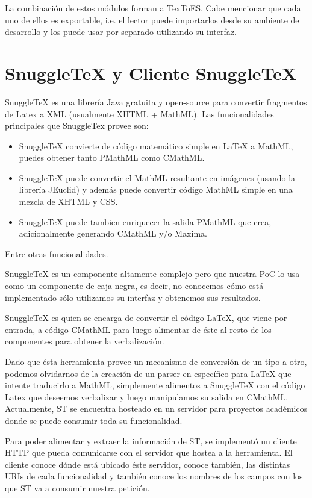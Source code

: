La combinación de estos módulos forman a TexToES. Cabe mencionar que cada uno de ellos es exportable, i.e. el lector puede importarlos desde su ambiente de desarrollo y los puede usar por separado utilizando su interfaz.

\section{SnuggleTeX y Cliente SnuggleTeX}

SnuggleTeX es una librería Java gratuita y open-source para convertir fragmentos de Latex a XML (usualmente XHTML + MathML). Las funcionalidades principales que SnuggleTex provee son:

\begin{itemize}
\item SnuggleTeX convierte de código matemático simple en LaTeX a MathML, puedes obtener tanto PMathML como CMathML.
\item SnuggleTeX puede convertir el MathML resultante en imágenes (usando la librería JEuclid) y además puede convertir código MathML simple en una mezcla de XHTML y CSS.
\item SnuggleTeX puede tambien enriquecer la salida PMathML que crea, adicionalmente generando CMathML y/o Maxima.
\end{itemize}

Entre otras funcionalidades.

SnuggleTeX es un componente altamente complejo pero que nuestra PoC lo usa como un componente de caja negra, es decir, no conocemos cómo está implementado sólo utilizamos su interfaz y obtenemos sus resultados.

SnuggleTeX es quien se encarga de convertir el código LaTeX, que viene por entrada, a código CMathML para luego alimentar de éste al resto de los componentes para obtener la verbalización.

Dado que ésta herramienta provee un mecanismo de conversión de un tipo a otro, podemos olvidarnos de la creación de un parser en específico para LaTeX que intente traducirlo a MathML, simplemente alimentos a SnuggleTeX con el código Latex que deseemos verbalizar y luego manipulamos su salida en CMathML. Actualmente, ST se encuentra hosteado en un servidor para proyectos académicos donde se puede consumir toda su funcionalidad.

Para poder alimentar y extraer la información de ST, se implementó un cliente HTTP que pueda comunicarse con el servidor que hostea a la herramienta. El cliente conoce dónde está ubicado éste servidor, conoce también, las distintas URIs de cada funcionalidad y también conoce los nombres de los campos con los que ST va a consumir nuestra petición.

